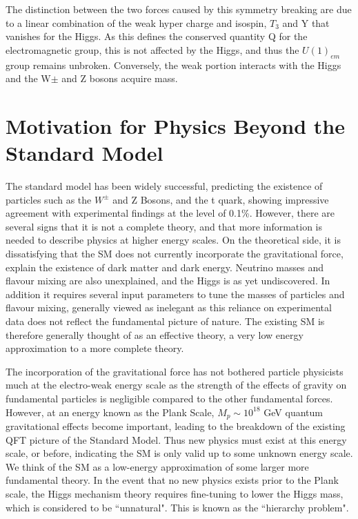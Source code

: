 The distinction between the two forces caused by this symmetry breaking are due to a linear combination of the weak hyper charge and isospin, $T_{3}$ and Y that vanishes for the Higgs. As this defines the conserved quantity Q for the electromagnetic group, this is not affected by the Higgs, and thus the $U(1)_{em}$ group remains unbroken. Conversely, the weak portion interacts with the Higgs and the W$\pm$ and Z bosons acquire mass.  

\section{Motivation for Physics Beyond the Standard Model}
The standard model has been widely successful, predicting the existence of particles such as the $W^{\pm}$ and Z Bosons, and the t quark, showing impressive agreement with experimental findings at the level of 0.1\%. However, there are several signs that it is not a complete theory, and that more information is needed to describe physics at higher energy scales. On the theoretical side, it is dissatisfying that the SM does not currently incorporate the gravitational force, explain the existence of dark matter and dark energy. Neutrino masses and flavour mixing are also unexplained, and the Higgs is as yet undiscovered. In addition it requires several input parameters to tune the masses of particles and flavour mixing, generally viewed as inelegant as this reliance on experimental data does not reflect the fundamental picture of nature.  The existing SM is therefore generally thought of as an effective theory, a very low energy approximation to a more complete theory\cite{PeskinSch}.

The incorporation of the gravitational force has not bothered particle physicists much at the electro-weak energy scale as the strength of the effects of gravity on fundamental particles is negligible compared to the other fundamental forces. However, at an energy known as the Plank Scale, $M_{p} \sim 10^{18}$ GeV quantum gravitational effects become important, leading to the breakdown of the existing QFT picture of the Standard Model. Thus new physics must exist at this energy scale, or before, indicating the SM is only valid up to some unknown energy scale. We think of the SM as a low-energy approximation of some larger more fundamental theory. In the event that no new physics exists prior to the Plank scale, the Higgs mechanism theory requires fine-tuning to lower the Higgs mass, which is considered to be ``unnatural". This is known as the ``hierarchy problem".

